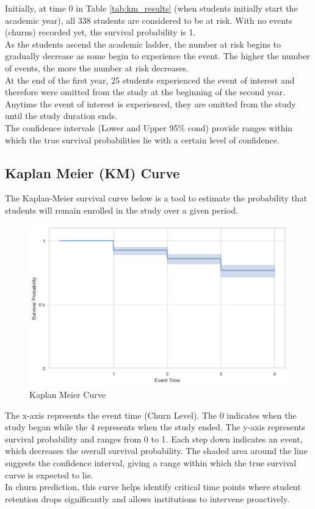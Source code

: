 \documentclass[doublespacing,12pt]{report}
\begin{document}
\noindent Initially, at time 0 in Table \ref{tab:km_results} (when students initially start the academic year), all 338 students are considered to be at risk. With no events (churns) recorded yet, the survival probability is 1.\\
As the students ascend the academic ladder, the number at risk begins to gradually decrease as some begin to experience the event. The higher the number of events, the more the number at risk decreases. \\
At the end of the first year, 25 students experienced the event of interest and therefore were omitted from the study at the beginning of the second year. Anytime the event of interest is experienced, they are omitted from the study until the study duration ends.\\
The confidence intervals (Lower and Upper 95\% cond) provide ranges within which the true survival probabilities lie with a certain level of confidence.

\subsection{Kaplan Meier (KM) Curve}

The Kaplan-Meier survival curve below is a tool to estimate the probability that students will remain enrolled in the study over a given period. 
\begin{figure}[H]
    \centering
    \includegraphics[width=1\linewidth]{Figure 4/4.1.png}
    \caption{Kaplan Meier Curve}
\end{figure}
\noindent  The x-axis represents the event time (Churn Level). The 0 indicates when the study began while the 4 represents when the study ended. The y-axis represents survival probability and ranges from 0 to 1. Each step down indicates an event, which decreases the overall survival probability.  The shaded area around the line suggests the confidence interval, giving a range within which the true survival curve is expected to lie.\\
In churn prediction, this curve helps identify critical time points where student retention drops significantly and allows institutions to intervene proactively. 
\end{document}

